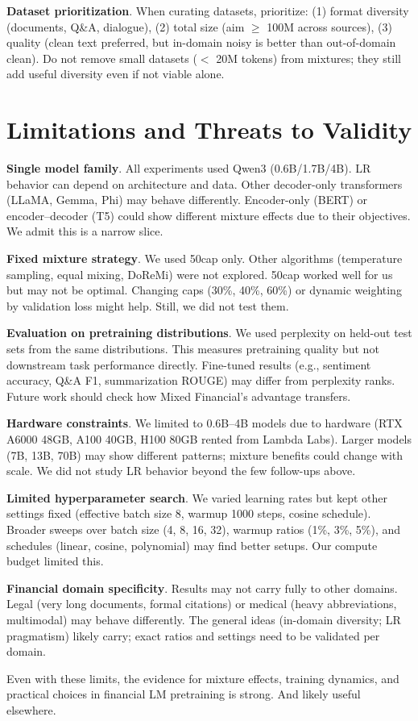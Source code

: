 \textbf{Dataset prioritization}. When curating datasets, prioritize: (1) format diversity (documents, Q\&A, dialogue), (2) total size (aim $\geq$ 100M across sources), (3) quality (clean text preferred, but in-domain noisy is better than out-of-domain clean). Do not remove small datasets ($<$ 20M tokens) from mixtures; they still add useful diversity even if not viable alone.

\section{Limitations and Threats to Validity}

\textbf{Single model family}. All experiments used Qwen3 (0.6B/1.7B/4B). LR behavior can depend on architecture and data. Other decoder-only transformers (LLaMA, Gemma, Phi) may behave differently. Encoder-only (BERT) or encoder--decoder (T5) could show different mixture effects due to their objectives. We admit this is a narrow slice.

\textbf{Fixed mixture strategy}. We used 50cap only. Other algorithms (temperature sampling, equal mixing, DoReMi) were not explored. 50cap worked well for us but may not be optimal. Changing caps (30\%, 40\%, 60\%) or dynamic weighting by validation loss might help. Still, we did not test them.

\textbf{Evaluation on pretraining distributions}. We used perplexity on held-out test sets from the same distributions. This measures pretraining quality but not downstream task performance directly. Fine-tuned results (e.g., sentiment accuracy, Q\&A F1, summarization ROUGE) may differ from perplexity ranks. Future work should check how Mixed Financial's advantage transfers.

\textbf{Hardware constraints}. We limited to 0.6B--4B models due to hardware (RTX A6000 48GB, A100 40GB, H100 80GB rented from Lambda Labs). Larger models (7B, 13B, 70B) may show different patterns; mixture benefits could change with scale. We did not study LR behavior beyond the few follow-ups above.

\textbf{Limited hyperparameter search}. We varied learning rates but kept other settings fixed (effective batch size 8, warmup 1000 steps, cosine schedule). Broader sweeps over batch size (4, 8, 16, 32), warmup ratios (1\%, 3\%, 5\%), and schedules (linear, cosine, polynomial) may find better setups. Our compute budget limited this.

\textbf{Financial domain specificity}. Results may not carry fully to other domains. Legal (very long documents, formal citations) or medical (heavy abbreviations, multimodal) may behave differently. The general ideas (in-domain diversity; LR pragmatism) likely carry; exact ratios and settings need to be validated per domain.

Even with these limits, the evidence for mixture effects, training dynamics, and practical choices in financial LM pretraining is strong. And likely useful elsewhere.
